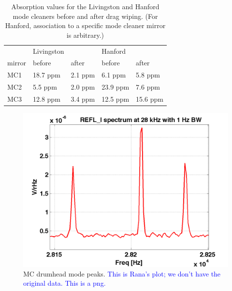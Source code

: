 \begin{table}
\caption{Absorption values for the Livingston and Hanford mode
 cleaners before and after drag wiping. (For Hanford, association to
 a specific mode cleaner mirror is arbitrary.)}
\centering
\begin{tabular}{l l l l l}
 & Livingston & & Hanford & \\
mirror & before & after & before & after \\
\hline\hline
MC1 & 18.7 ppm & 2.1 ppm & 6.1 ppm & 5.8 ppm \\
MC2 & 5.5 ppm & 2.0 ppm & 23.9 ppm & 7.6 ppm \\
MC3 & 12.8 ppm & 3.4 ppm & 12.5 ppm & 15.6 ppm \\
\hline
\end{tabular}
\label{tab:MCabsorption2}
\end{table}


\begin{figure}
\begin{centering}
\includegraphics[width=1.0\textwidth]{figures/rana-1229241548.png}
\caption{MC drumhead mode peaks. \textcolor{blue}{This is Rana's plot; we don't have
  the original data. This is a png.}}
\label{fig:MCpeaks}
\end{centering}
\end{figure}


